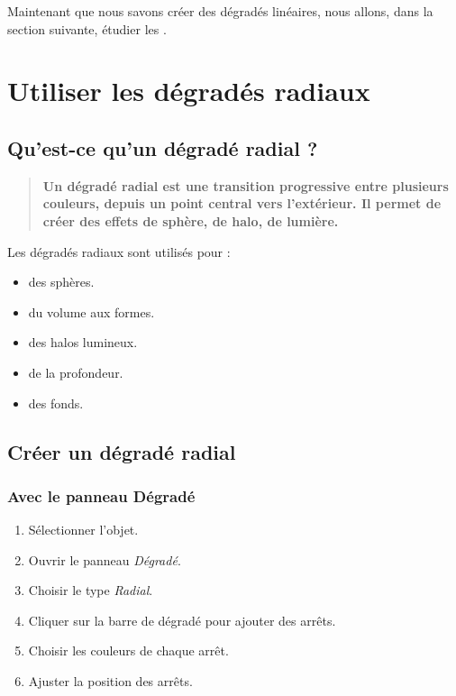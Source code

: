Maintenant que nous savons créer des dégradés linéaires, nous allons, dans la section suivante, étudier les .

\section{Utiliser les dégradés radiaux}

\subsection{Qu'est-ce qu'un dégradé radial ?}

\begin{quote}
\textbf{Un dégradé radial est une transition progressive entre plusieurs couleurs, depuis un point central vers l'extérieur. Il permet de créer des effets de sphère, de halo, de lumière.}
\end{quote}

Les dégradés radiaux sont utilisés pour :

\begin{itemize}
    \item {} des sphères.
    \item {} du volume aux formes.
    \item {} des halos lumineux.
    \item {} de la profondeur.
    \item {} des fonds.
\end{itemize}

\subsection{Créer un dégradé radial}

\subsubsection{Avec le panneau Dégradé}

\begin{enumerate}
    \item Sélectionner l'objet.
    \item Ouvrir le panneau \emph{Dégradé}.
    \item Choisir le type \emph{Radial}.
    \item Cliquer sur la barre de dégradé pour ajouter des arrêts.
    \item Choisir les couleurs de chaque arrêt.
    \item Ajuster la position des arrêts.
\end{enumerate}

